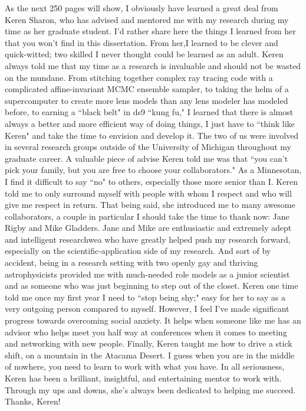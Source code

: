 As the next 250 pages will show, I obviously have learned a great deal from Keren Sharon, who has advised and mentored me with my research during my time as her graduate student. I'd rather share here the things I learned from her that you won't find in this dissertation. From her,I learned to be clever and quick-witted; two skilled I never thought could be learned as an adult. Keren always told me that my time as a research is invaluable and should not be wasted on the mundane. From stitching together complex ray tracing code with a complicated affine-invariant MCMC ensemble sampler, to taking the helm of a supercomputer to create more lens models than any lens modeler has modeled before, to earning a ``black belt" in ds9 ``kung fu," I learned that there is almost always a better and more efficient way of doing things, I just have to ``think like Keren" and take the time to envision and develop it. The two of us were involved in several research groups outside of the University of Michigan throughout my graduate career. A valuable piece of advise Keren told me was that ``you can't pick your family, but you are free to choose your collaborators." As a Minnesotan, I find it difficult to say ``no" to others, especially those more senior than I. Keren told me to only surround myself with people with whom I respect and who will give me respect in return. That being said, she introduced me to many awesome collaborators, a couple in particular I should take the time to thank now: Jane Rigby and Mike Gladders. Jane and Mike are enthusiastic and extremely adept and intelligent researchwea who have greatly helped push my research forward, especially on the scientific-application side of my research. And sort of by accident, being in a research setting with two openly gay and thriving astrophysicists provided me with much-needed role models as a junior scientist and as someone who was just beginning to step out of the closet. Keren one time told me once my first year I need to ``stop being shy;" easy for her to say as a very outgoing person compared to myself. However, I feel I've made significant progress towards overcoming social anxiety. It helps when someone like me has an advisor who helps meet you half way at conferences when it comes to meeting and networking with new people. Finally, Keren taught me how to drive a stick shift, on a mountain in the Atacama Desert. I guess when you are in the middle of nowhere, you need to learn to work with what you have. In all seriousness, Keren has been a brilliant, insightful, and entertaining mentor to work with. Through my ups and downs, she's always been dedicated to helping me succeed. Thanks, Keren!

